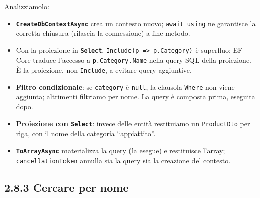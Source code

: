 \documentclass[
  italian,
  10pt,
]{book}
\providecommand{\tightlist}{%
  \setlength{\itemsep}{0pt}\setlength{\parskip}{0pt}}
\begin{document}
Analizziamolo:

\begin{itemize}
\tightlist
\item
  \textbf{\texttt{CreateDbContextAsync}} crea un contesto nuovo;
  \texttt{await\ using} ne garantisce la corretta chiusura (rilascia la
  connessione) a fine metodo.
\item
  Con la proiezione in \textbf{\texttt{Select}},
  \texttt{Include(p\ =\textgreater{}\ p.Category)} è superfluo: EF Core
  traduce l'accesso a \texttt{p.Category.Name} nella query SQL della
  proiezione. È la proiezione, non \texttt{Include}, a evitare query
  aggiuntive.
\item
  \textbf{Filtro condizionale}: se \texttt{category} è \texttt{null}, la
  clausola \texttt{Where} non viene aggiunta; altrimenti filtriamo per
  nome. La query è composta prima, eseguita dopo.
\item
  \textbf{Proiezione con \texttt{Select}}: invece delle entità
  restituiamo un \texttt{ProductDto} per riga, con il nome della
  categoria ``appiattito''.
\item
  \textbf{\texttt{ToArrayAsync}} materializza la query (la esegue) e
  restituisce l'array; \texttt{cancellationToken} annulla sia la query
  sia la creazione del contesto.
\end{itemize}

\subsection{2.8.3 Cercare per nome}\label{cercare-per-nome}
\end{document}
